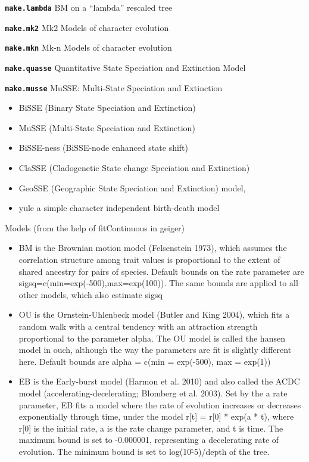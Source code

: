 \documentclass[10pt,landscape]{article}
\newcommand{\bcode}[1]{\texttt{\textbf{#1}}}
\begin{document}
\begin{CJK}{UTF8}{gbsn}
\begin{multicols}{3}
\bcode{make.lambda} BM on a “lambda” rescaled tree

\bcode{make.mk2} Mk2 Models of character evolution

\bcode{make.mkn} Mk-n Models of character evolution

\bcode{make.quasse} Quantitative State Speciation and Extinction Model

\bcode{make.musse} MuSSE: Multi-State Speciation and Extinction

\begin{itemize}
\item BiSSE (Binary State Speciation and Extinction)
\item MuSSE (Multi-State Speciation and Extinction)
\item BiSSE-ness (BiSSE-node enhanced state shift)
\item ClaSSE (Cladogenetic State change Speciation and Extinction)
\item GeoSSE (Geographic State Speciation and Extinction) model, 
\item yule a simple character independent birth-death model
\end{itemize}

Models (from the help of fitContinuous in geiger)
\begin{itemize}

\item BM is the Brownian motion model (Felsenstein 1973), which assumes the correlation structure among trait values is proportional to the extent of shared ancestry for pairs of species. Default bounds on the rate parameter are sigsq=c(min=exp(-500),max=exp(100)). The same bounds are applied to all other models, which also estimate sigsq

\item OU is the Ornstein-Uhlenbeck model (Butler and King 2004), which fits a random walk with a central tendency with an attraction strength proportional to the parameter alpha. The OU model is called the hansen model in ouch, although the way the parameters are fit is slightly different here. Default bounds are alpha = c(min = exp(-500), max = exp(1))

\item EB is the Early-burst model (Harmon et al. 2010) and also called the ACDC model (accelerating-decelerating; Blomberg et al. 2003). Set by the a rate parameter, EB fits a model where the rate of evolution increases or decreases exponentially through time, under the model r[t] = r[0] * exp(a * t), where r[0] is the initial rate, a is the rate change parameter, and t is time. The maximum bound is set to -0.000001, representing a decelerating rate of evolution. The minimum bound is set to log(10\^-5)/depth of the tree.


\end{itemize}
\end{multicols}
\end{CJK}
\end{document}
